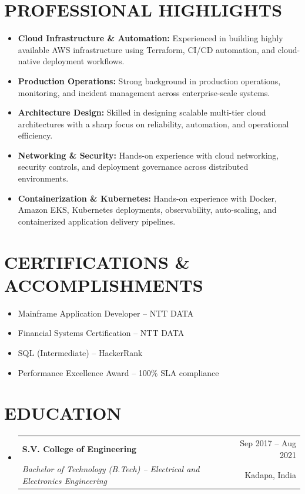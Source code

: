 \documentclass[letterpaper,11pt]{article}
\makeatletter
\newcommand{\resumeItem}[1]{
  \item\small{
    {#1 \vspace{-1pt}}
  }
}
\newcommand{\resumeSubheading}[4]{
  \vspace{-1pt}\item
    \begin{tabular*}{\textwidth}[t]{l@{\extracolsep{\fill}}r}
      \textbf{#1} & {\color{dark-grey}\small #2}\vspace{1pt}\\ %
      \textit{#3} & {\color{dark-grey} \small #4}\\ %
    \end{tabular*}\vspace{-4pt}
}
\newcommand{\resumeSubHeadingListStart}{\begin{itemize}[leftmargin=0in, label={}, itemsep=0pt, parsep=2pt]}
\newcommand{\resumeSubHeadingListEnd}{\end{itemize}}
\newcommand{\resumeItemListStart}{\begin{itemize}[leftmargin=0.15in, itemsep=1pt, parsep=0pt, topsep=0pt]}
\newcommand{\resumeItemListEnd}{\end{itemize}\vspace{2pt}}
\makeatother
\begin{document}
\section{PROFESSIONAL HIGHLIGHTS}
  \resumeItemListStart
    \resumeItem{\textbf{Cloud Infrastructure \& Automation:} Experienced in building highly available AWS infrastructure using Terraform, CI/CD automation, and cloud-native deployment workflows.}
    \resumeItem{\textbf{Production Operations:} Strong background in production operations, monitoring, and incident management across enterprise-scale systems.}
    \resumeItem{\textbf{Architecture Design:} Skilled in designing scalable multi-tier cloud architectures with a sharp focus on reliability, automation, and operational efficiency.}
    \resumeItem{\textbf{Networking \& Security:} Hands-on experience with cloud networking, security controls, and deployment governance across distributed environments.}
    \resumeItem{\textbf{Containerization \& Kubernetes:} Hands-on experience with Docker, Amazon EKS, Kubernetes deployments, observability, auto-scaling, and containerized application delivery pipelines.}
  \resumeItemListEnd

\section{CERTIFICATIONS \& ACCOMPLISHMENTS}
  \resumeItemListStart
    \resumeItem{Mainframe Application Developer -- NTT DATA}
    \resumeItem{Financial Systems Certification -- NTT DATA}
    \resumeItem{SQL (Intermediate) -- HackerRank}
    \resumeItem{Performance Excellence Award -- 100\% SLA compliance}
  \resumeItemListEnd

\section{EDUCATION}
  \resumeSubHeadingListStart
    \resumeSubheading
      {S.V. College of Engineering}{Sep 2017 -- Aug 2021}
      {Bachelor of Technology (B.Tech) -- Electrical and Electronics Engineering}{Kadapa, India}
  \resumeSubHeadingListEnd
\end{document}
